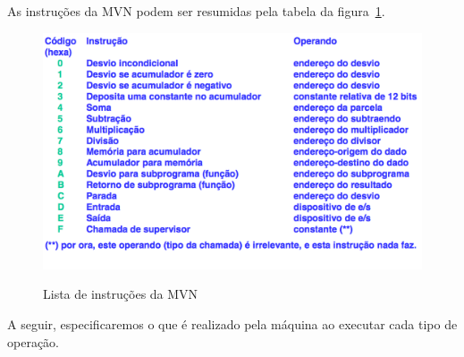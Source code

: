 
As instruções da MVN podem ser resumidas pela tabela da figura~\ref{fig:instrucoes-mvn}.

\begin{figure}[ht]
	\centering
	\caption{Lista de instruções da MVN}
	\includegraphics[width=\textwidth]{images/instrucoes-mvn.png}
	\label{fig:instrucoes-mvn}
\end{figure}

A seguir, especificaremos o que é realizado pela máquina ao executar cada tipo de operação.		

